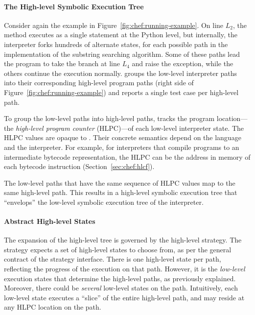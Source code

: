 \paragraph{The High-level Symbolic Execution Tree}

Consider again the example in Figure~\ref{fig:chef:running-example}.
%
On line $L_2$, the  method executes as a single statement at the Python level, but internally, the interpreter forks hundreds of alternate states, for each possible path in the implementation of the substring searching algorithm.
%
Some of these paths lead the program to take the branch at line $L_4$ and raise the exception, while the others continue the execution normally.
%
\chef groups the low-level interpreter paths into their corresponding high-level program paths (right side of Figure~\ref{fig:chef:running-example}) and reports a single test case per high-level path.


To group the low-level paths into high-level paths, \chef tracks the program location---the \emph{high-level program counter} (HLPC)---of each low-level interpreter state.
%
The HLPC values are opaque to \chef.  Their concrete semantics depend on the language and the interpreter.  For example, for interpreters that compile programs to an intermediate bytecode representation, the HLPC can be the address in memory of each bytecode instruction (Section~\ref{sec:chef:hlcf}).

The low-level paths that have the same sequence of HLPC values map to the same high-level path.
%
This results in a high-level symbolic execution tree that ``envelops'' the low-level symbolic execution tree of the interpreter.

\paragraph{Abstract High-level States}

The expansion of the high-level tree is governed by the high-level strategy.
%
The strategy expects a set of high-level states to choose from, as per the general contract of the strategy interface.  There is one high-level state per path, reflecting the progress of the execution on that path.
%
However, it is the \emph{low-level} execution states that determine the high-level paths, as previously explained.
%
Moreover, there could be \emph{several} low-level states on the path.
Intuitively, each low-level state executes a ``slice'' of the entire high-level path, and may reside at any HLPC location on the path.


